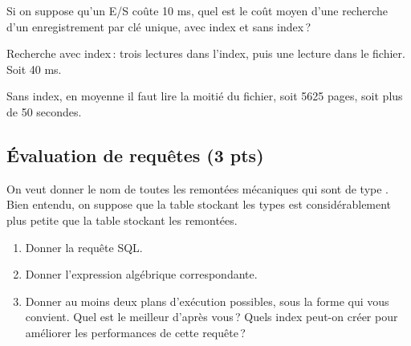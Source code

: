 \begin{enumerate}
\begin{solution}
   \item  Si on suppose qu'un E/S coûte 10 ms, quel est le coût moyen
    d'une recherche
     d'un enregistrement par clé unique,
   avec index et sans index\,?


Recherche avec index\,: trois lectures dans l'index, 
puis une lecture dans le fichier. Soit 40 ms.

Sans index, en moyenne il faut lire la moitié du fichier,
soit 5625 pages, soit plus de 50 secondes.
\end{solution}
\end{enumerate}


\subsection*{\'Evaluation de requêtes (3 pts)}

On veut donner le nom de toutes les remontées
mécaniques qui sont de type . Bien entendu, on suppose
que la table stockant les types est considérablement plus petite
que la table stockant les remontées.

\begin{enumerate}
   \item Donner la requête SQL.
   \item Donner l'expression algébrique correspondante.
    \item Donner au moins deux plans d'exécution possibles, sous la 
             forme qui vous convient.
          Quel est le meilleur d'après vous\,? Quels
     index peut-on créer pour améliorer les performances de cette requête\,?

\end{enumerate}
